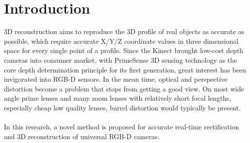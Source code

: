 
\chapter{Introduction} %
\label{sens_introduction} %


3D reconstruction aims to reproduce the 3D profile of real objects as accurate as possible, which require accurate X/Y/Z coordinate values in three dimensional space for every single point of a profile. Since the Kinect brought low-cost depth cameras into consumer market, with PrimeSense 3D sensing technology as the core depth determination principle for its first generation, great interest has been invigorated into RGB-D sensors. In the mean time, optical and perspective distortion become a problem that stops from getting a good view. On most wide angle prime lenses and many zoom lenses with relatively short focal lengths,  especially cheap low quality lenses, barrel distortion would typically be present.
\\\\In this research, a novel method is proposed for accurate real-time rectification and 3D reconstruction of universal RGB-D cameras. 

